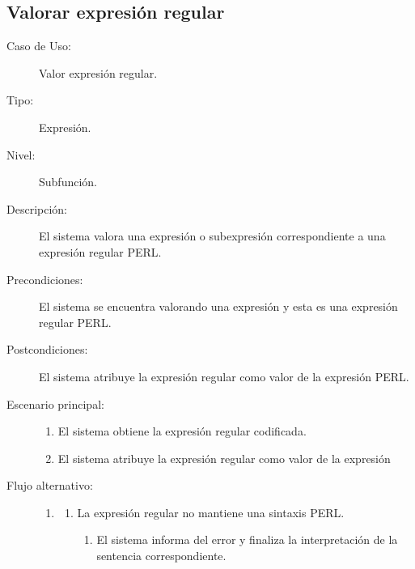 \subsection {Valorar expresión regular}
\begin{framed}
\FloatBarrier
\begin{description}
   \item[Caso de Uso:]  Valor expresión regular.
   \item [Tipo:] Expresión.
   \item[Nivel:]  Subfunción.
   \item[Descripción:] 
   El sistema valora una expresión o subexpresión correspondiente a
   una expresión regular PERL.
   \item[Precondiciones:] 
   El sistema se encuentra valorando una expresión y esta es una expresión regular PERL.
   \item[Postcondiciones:] 
   El sistema atribuye la expresión regular como valor de la expresión PERL.
   \item[Escenario principal:] \hfill
   \begin{enumerate}
   \item El sistema obtiene la expresión regular codificada.
   \item El sistema atribuye la expresión regular como valor de la expresión
   \end{enumerate}
    \item[Flujo alternativo:] \hfill 
   \begin{enumerate} \itemsep1pt \parskip0pt 
   \setcounter{enumi}{0}
   \renewcommand{\labelenumi}{}
   \renewcommand{\labelenumiii}{\arabic{enumiii}.}
   \renewcommand{\labelenumii}{\arabic{enumi}\alph{enumii}.}
      \item 
      \begin {enumerate}
         \setcounter{enumii}{0}
         \item La expresión regular no mantiene una sintaxis PERL.
         \begin{enumerate}
         \item El sistema informa del error y finaliza la interpretación
         de la sentencia correspondiente.
         \end{enumerate}
      \end{enumerate}
   \end{enumerate}
\end{description}
 \FloatBarrier
\end{framed}

